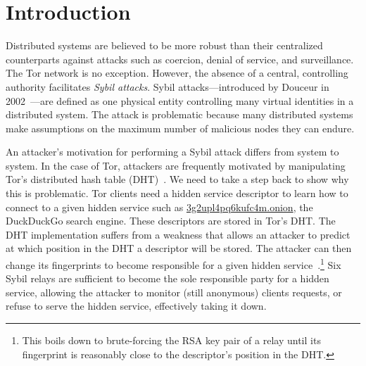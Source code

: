 \section{Introduction}
\label{sec:introduction}

Distributed systems are believed to be more robust than their centralized
counterparts against attacks such as coercion, denial of service, and
surveillance.  The Tor network is no exception. 
However, the absence of a central, controlling authority facilitates
\emph{Sybil attacks}.  Sybil attacks---introduced by Douceur in
2002~\cite{Douceur2002a}---are defined as one physical entity controlling many
virtual identities in a distributed system.  The attack is problematic because
many distributed systems make assumptions on the maximum number of malicious
nodes they can endure.

An attacker's motivation for performing a Sybil attack differs from system to
system.  In the case of Tor, attackers are frequently motivated by manipulating
Tor's distributed hash table (DHT)~\cite{rendspec}.  We need to take a step back
to show why this is problematic.  Tor clients need a hidden service
descriptor to learn how to connect to a given hidden service such as
\url{3g2upl4pq6kufc4m.onion}, the DuckDuckGo search engine.  These descriptors
are stored in Tor's DHT.  The DHT implementation suffers from a weakness that
allows an attacker to predict at which position in the DHT a descriptor will be
stored.  The attacker can then change its fingerprints to become responsible
for a given hidden service~\cite{Biryukov2013a}.\footnote{This boils down to
brute-forcing the RSA key pair of a relay until its fingerprint is reasonably
close to the descriptor's position in the DHT.}  Six Sybil relays are
sufficient to become the sole responsible party for a hidden service, allowing
the attacker to monitor (still anonymous) clients requests, or refuse to serve
the hidden service, effectively taking it down.


